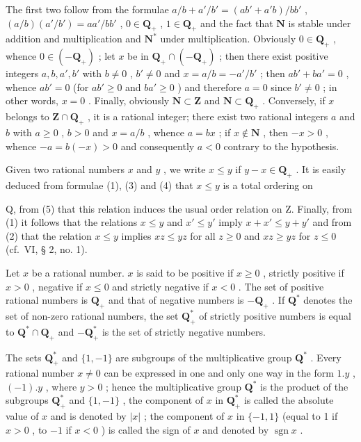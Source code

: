 The first two follow from the formulae \(a / b + a' / b' = (ab' + a'b) / bb'\) , \((a / b)(a'/b') = aa'/bb'\) , \(0 \in \mathbf{Q}_+\) , \(1 \in \mathbf{Q}_+\) and the fact that \(\mathbf{N}\) is stable under addition and multiplication and \(\mathbf{N}^*\) under multiplication. Obviously \(0 \in \mathbf{Q}_+\) , whence \(0 \in (-\mathbf{Q}_+)\) ; let \(x\) be in \(\mathbf{Q}_+ \cap (-\mathbf{Q}_+)\) ; then there exist positive integers \(a, b, a', b'\) with \(b \neq 0\) , \(b' \neq 0\) and \(x = a / b = -a'/b'\) ; then \(ab' + ba' = 0\) , whence \(ab' = 0\) (for \(ab' \geqslant 0\) and \(ba' \geqslant 0\) ) and therefore \(a = 0\) since \(b' \neq 0\) ; in other words, \(x = 0\) . Finally, obviously \(\mathbf{N} \subset \mathbf{Z}\) and \(\mathbf{N} \subset \mathbf{Q}_+\) . Conversely, if \(x\) belongs to \(\mathbf{Z} \cap \mathbf{Q}_+\) , it is a rational integer; there exist two rational integers \(a\) and \(b\) with \(a \geqslant 0\) , \(b > 0\) and \(x = a / b\) , whence \(a = bx\) ; if \(x \notin \mathbf{N}\) , then \(-x > 0\) , whence \(-a = b(-x) > 0\) and consequently \(a < 0\) contrary to the hypothesis.

Given two rational numbers \(x\) and \(y\) , we write \(x \leqslant y\) if \(y - x \in \mathbf{Q}_+\) . It is easily deduced from formulae (1), (3) and (4) that \(x \leqslant y\) is a total ordering on

Q, from (5) that this relation induces the usual order relation on Z. Finally, from (1) it follows that the relations \(x \leqslant y\) and \(x' \leqslant y'\) imply \(x + x' \leqslant y + y'\) and from (2) that the relation \(x \leqslant y\) implies \(xz \leqslant yz\) for all \(z \geqslant 0\) and \(xz \geqslant yz\) for \(z \leqslant 0\) (cf.~VI, § 2, no. 1).

Let \(x\) be a rational number. \(x\) is said to be positive if \(x \geqslant 0\) , strictly positive if \(x > 0\) , negative if \(x \leqslant 0\) and strictly negative if \(x < 0\) . The set of positive rational numbers is \(\mathbf{Q}_{+}\) and that of negative numbers is \(-\mathbf{Q}_{+}\) . If \(\mathbf{Q}^{*}\) denotes the set of non-zero rational numbers, the set \(\mathbf{Q}_{+}^{*}\) of strictly positive numbers is equal to \(\mathbf{Q}^{*} \cap \mathbf{Q}_{+}\) and \(-\mathbf{Q}_{+}^{*}\) is the set of strictly negative numbers.

The sets \(\mathbf{Q}_{+}^{*}\) and \(\{1, -1\}\) are subgroups of the multiplicative group \(\mathbf{Q}^{*}\) . Every rational number \(x \neq 0\) can be expressed in one and only one way in the form \(1.y\) , \((-1).y\) , where \(y > 0\) ; hence the multiplicative group \(\mathbf{Q}^{*}\) is the product of the subgroups \(\mathbf{Q}_{+}^{*}\) and \(\{1, -1\}\) , the component of \(x\) in \(\mathbf{Q}_{+}^{*}\) is called the absolute value of \(x\) and is denoted by \(|x|\) ; the component of \(x\) in \(\{-1, 1\}\) (equal to 1 if \(x > 0\) , to \(-1\) if \(x < 0\) ) is called the sign of \(x\) and denoted by \(\operatorname{sgn} x\) .

